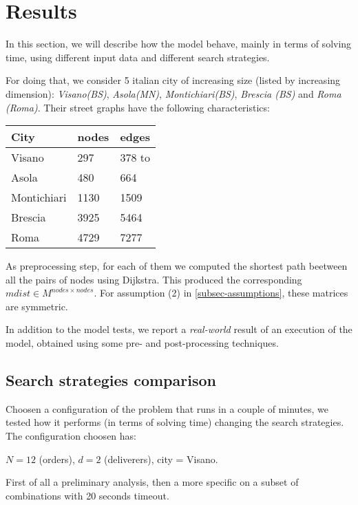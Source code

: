 \documentclass[10pt]{article}
\begin{document}
	\section{Results}
	\label{Results}

	In this section, we will describe how the model behave, mainly in terms of solving
	time, using different input data and different search strategies.

	For doing that, we consider 5 italian city of increasing size (listed by increasing dimension): 
	\textit{Visano(BS)}, \textit{Asola(MN)}, \textit{Montichiari(BS)}, \textit{Brescia (BS)} and \textit{Roma (Roma)}.
	Their street graphs have the following characteristics:%
	\begin{table*}[h]
		\centering
		\begin{tabular}{l|ll}
			City & nodes & edges \\
			\hline
			Visano & 297 & 378 to\\
			Asola & 480 & 664 \\
			Montichiari & 1130 & 1509 \\
			Brescia & 3925 & 5464 \\
			Roma & 4729 & 7277 \\
		\end{tabular}		
	\end{table*}
	
	As preprocessing step, for each of them we computed the shortest path beetween all the pairs
	of nodes using Dijkstra. This produced the corresponding $mdist \in M^{nodes \times nodes}$.
	For assumption (2) in \cref{subsec-assumptions}, these matrices are symmetric.

	In addition to the model tests, we report a \textit{real-world} result of an execution of the model, obtained using some pre- and post-processing techniques.  

	\subsection{Search strategies comparison}
	\label{subsec:test-strategies}
	Choosen a configuration of the problem that runs in a couple of minutes,
	we tested how it performs (in terms of solving time) changing the search strategies.
	The configuration choosen has:
	\begin{center}
		$N = 12$ (orders), $d = 2$ (deliverers), city = Visano.		
	\end{center}

	First of all a preliminary analysis, then a more specific on a subset of combinations 
	with 20 seconds timeout.
\end{document}
